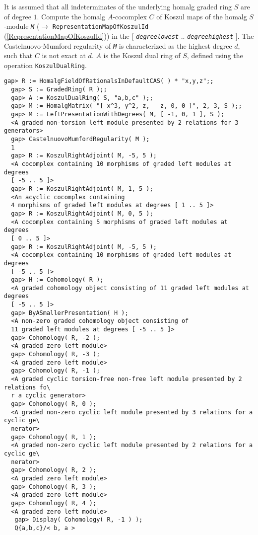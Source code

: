 \documentclass[a4paper,11pt]{report}
\begin{document}
{{{ It is assumed that all indeterminates of the underlying \textsf{homalg} graded ring $S$ are of degree $1$. Compute the \textsf{homalg} $A$-cocomplex $C$ of Koszul maps of the \textsf{homalg} $S$-module \mbox{\texttt{\slshape M}} ($\to$ \texttt{RepresentationMapOfKoszulId} (\ref{RepresentationMapOfKoszulId})) in the $[$ \mbox{\texttt{\slshape degree{\textunderscore}lowest}} .. \mbox{\texttt{\slshape degree{\textunderscore}highest}} $]$. The Castelnuovo-Mumford regularity of \mbox{\texttt{\slshape M}} is characterized as the highest degree $d$, such that $C$ is not exact at $d$. $A$ is the Koszul dual ring of $S$, defined using the operation \texttt{KoszulDualRing}. 
\begin{Verbatim}[fontsize=\small,frame=single,label=Example]
  gap> R := HomalgFieldOfRationalsInDefaultCAS( ) * "x,y,z";;
  gap> S := GradedRing( R );;
  gap> A := KoszulDualRing( S, "a,b,c" );;
  gap> M := HomalgMatrix( "[ x^3, y^2, z,   z, 0, 0 ]", 2, 3, S );;
  gap> M := LeftPresentationWithDegrees( M, [ -1, 0, 1 ], S );
  <A graded non-torsion left module presented by 2 relations for 3 generators>
  gap> CastelnuovoMumfordRegularity( M );
  1
  gap> R := KoszulRightAdjoint( M, -5, 5 );
  <A cocomplex containing 10 morphisms of graded left modules at degrees
  [ -5 .. 5 ]>
  gap> R := KoszulRightAdjoint( M, 1, 5 );
  <An acyclic cocomplex containing
  4 morphisms of graded left modules at degrees [ 1 .. 5 ]>
  gap> R := KoszulRightAdjoint( M, 0, 5 );
  <A cocomplex containing 5 morphisms of graded left modules at degrees
  [ 0 .. 5 ]>
  gap> R := KoszulRightAdjoint( M, -5, 5 );
  <A cocomplex containing 10 morphisms of graded left modules at degrees
  [ -5 .. 5 ]>
  gap> H := Cohomology( R );
  <A graded cohomology object consisting of 11 graded left modules at degrees 
  [ -5 .. 5 ]>
  gap> ByASmallerPresentation( H );
  <A non-zero graded cohomology object consisting of
  11 graded left modules at degrees [ -5 .. 5 ]>
  gap> Cohomology( R, -2 );
  <A graded zero left module>
  gap> Cohomology( R, -3 );
  <A graded zero left module>
  gap> Cohomology( R, -1 );
  <A graded cyclic torsion-free non-free left module presented by 2 relations fo\
  r a cyclic generator>
  gap> Cohomology( R, 0 );
  <A graded non-zero cyclic left module presented by 3 relations for a cyclic ge\
  nerator>
  gap> Cohomology( R, 1 );
  <A graded non-zero cyclic left module presented by 2 relations for a cyclic ge\
  nerator>
  gap> Cohomology( R, 2 );
  <A graded zero left module>
  gap> Cohomology( R, 3 );
  <A graded zero left module>
  gap> Cohomology( R, 4 );
  <A graded zero left module>
   gap> Display( Cohomology( R, -1 ) );
   Q{a,b,c}/< b, a >
   

\end{Verbatim}}}}
\end{document}
